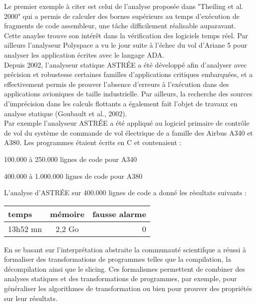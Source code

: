 \documentclass[french]{article}
\begin{document}
Le premier exemple à citer est celui de l'analyse proposée dans "Theiling et al. 2000" qui a permis de calculer des bornes supérieurs au temps d'exécution de fragments de code assembleur, une tâche difficilement réalisable auparavant. Cette anaylse trouve son intérêt dans la vérification des logiciels temps réel. Par ailleurs l'analyseur Polyspace a vu le jour suite à l'échec du vol d'Ariane 5 pour analyser les application écrites avec le langage ADA. \\

Depuis 2002, l’analyseur statique ASTRÉE a été développé afin d’analyser avec précision et robustesse certaines familles d’applications critiques embarquées, et a effectivement
permis de prouver l’absence d’erreurs à l’exécution dans des applications avioniques
de taille industrielle. Par ailleurs, la recherche des sources d’imprécision dans les calculs flottants a également fait l’objet de travaux en analyse statique (Goubault et al., 2002). \\

Par exemple l'analyseur ASTRÉE a été appliqué au logiciel primaire de contrôle de vol du système de commande de vol électrique de a famille des Airbus A340 et A380. Les programmes étaient écrits en C et contenaient : \\
\begin{description}
  \item 100.000 à 250.000 lignes de code pour A340
    \item 400.000 à 1.000.000 lignes de code pour A380 \\
\end{description}

L'analyse d'ASTRÉE sur 400.000 lignes de code a donné les résultats suivants : \\
\begin{center}
\begin{tabular}{|l|c|r|}
  \hline
  temps & mémoire & fausse alarme \\
  \hline
  13h52 mn & 2,2 Go & 0 \\
  \hline
\end{tabular}
\end{center}

En se basant sur l'interprétation abstraite la communauté scientifque a réussi à formaliser des transformations de programmes telles que la compilation, la décompilation ainsi que le slicing. Ces formalismes permettent de combiner des analyses statiques et des transformations de programmes, par exemple, pour généraliser les algorithmes de transformation ou bien pour prouver des propriétés sur leur résultats.
\end{document}
